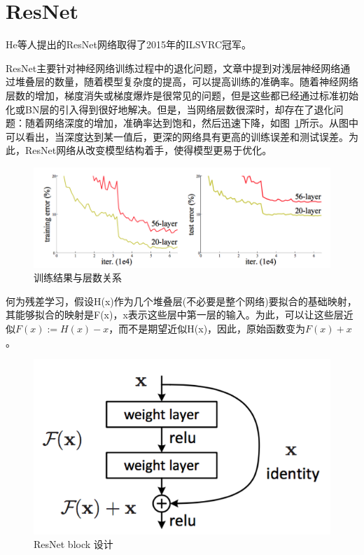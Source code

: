 \section{ResNet}

He等人\cite{he2016deep}提出的ResNet网络取得了2015年的ILSVRC冠军。

ResNet主要针对神经网络训练过程中的退化问题，文章中提到对浅层神经网络通过堆叠层的数量，随着模型复杂度的提高，可以提高训练的准确率。随着神经网络层数的增加，梯度消失或梯度爆炸是很常见的问题，但是这些都已经通过标准初始化或BN层的引入得到很好地解决。但是，当网络层数很深时，却存在了退化问题：随着网络深度的增加，准确率达到饱和，然后迅速下降，如图~\ref{fig:ResNet_compare_layers}所示。从图中可以看出，当深度达到某一值后，更深的网络具有更高的训练误差和测试误差。为此，ResNet网络从改变模型结构着手，使得模型更易于优化。

\begin{figure}[htbp]
	\centering
	\includegraphics[width=\linewidth]{readings_figures/ResNet_compare_layers.jpeg}
	\caption{训练结果与层数关系}
	\label{fig:ResNet_compare_layers}
\end{figure}

何为残差学习，假设H(x)作为几个堆叠层(不必要是整个网络)要拟合的基础映射，其能够拟合的映射是F(x)，x表示这些层中第一层的输入。为此，可以让这些层近似$F(x):=H(x)-x$，而不是期望近似H(x)，因此，原始函数变为$F(x)+x$。

\begin{figure}[htbp]
	\centering
	\includegraphics[width=\linewidth]{readings_figures/ResNet_block.jpeg}
	\caption{ResNet block 设计}
	\label{fig:ResNet_block}
\end{figure}

